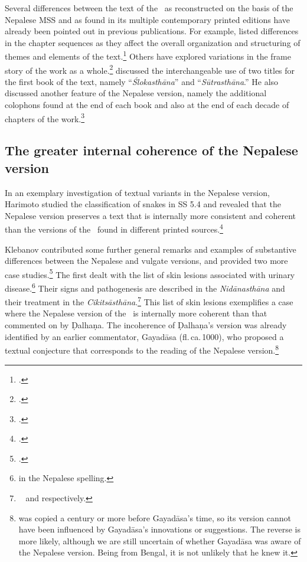 
Several differences between the text of the \SS\ as reconstructed on the basis of
the Nepalese MSS and as found in its multiple contemporary printed editions have
already been pointed out in previous publications.  For example,
\citeauthor{kleb-2021b} listed differences in the chapter sequences as they
affect the overall organization and structuring of themes and elements of the
text.\footcite[27\,f.]{kleb-2021b} Others have explored variations in the frame
story of the work as a whole.\footcites{wuja-2013} [28-32]{kleb-2021b}
{birc-2021} [2-4]{birc-2021a} \citeauthor{kleb-2021b} discussed the
interchangeable use of two titles for the first book of the text, namely
“\emph{Ślokasthāna}” and “\emph{Sūtrasthāna}.” He also discussed another feature
of the Nepalese version, namely the additional colophons found at
the end of each book and also at the end of each decade of chapters of the
work.\footcite[32--44]{kleb-2021b}

\subsection{The greater internal coherence of the Nepalese version}

In an exemplary investigation of textual variants in the Nepalese version,
Harimoto studied the classification of snakes in SS 5.4 and revealed that the
Nepalese version preserves a text that is internally more consistent and coherent
than the versions of the \SS\ found in different printed
sources.\footcite[101–104]{hari-2011}

Klebanov contributed some further general remarks and examples of substantive
differences between the Nepalese and vulgate versions, and provided two more case
studies.\footcite[44--55]{kleb-2021b} The first dealt with the list of skin
lesions associated with urinary disease.\footnote{ in the
    Nepalese spelling.}  Their signs and pathogenesis are described in the
    \emph{Nidānasthāna} and their treatment in the \emph{Cikitsāsthāna}.\footnote{\SS\
         and  respectively.} This list of skin
        lesions exemplifies a case where the Nepalese version of the \SS\ is internally
        more coherent than that commented on by Ḍalhaṇa. The incoherence of Ḍalhaṇa's
        version was already identified by an earlier commentator, Gayadāsa
        (fl.\,ca.\,1000), who proposed a textual conjecture that corresponds to the
        reading of the Nepalese version.\footnote{\MScite{Kathmandu KL 699} was copied a
            century or more before Gayadāsa's time, so its version cannot have been 
            influenced
            by Gayadāsa's innovations or suggestions.  The reverse is more likely, although 
            we
            are still uncertain of whether Gayadāsa was aware of the Nepalese version. Being
            from Bengal, it is not unlikely that he knew it.}

